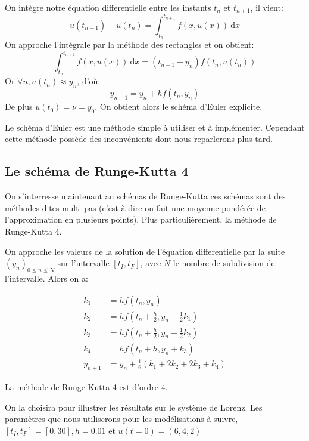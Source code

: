 \documentclass{article}
\newcommand{\cad}{c'est-\`a-dire }
\newtheorem[M , nocut]{prop}{Proposition}[section]
\newtheorem[M , nocut]{definition}{Définition}
\newtheorem[M , nocut]{lemme}{Lemme}
\newtheorem[L , nocut]{thm}{Théoreme}
\newtheorem[M , nocut]{cor}{Corollaire}
\begin{document}
\begin{example}
    On intègre notre équation differentielle entre les instants $t_{n}$ et $t_{n+1}$, il vient:
    \[
      u(t_{n+1}) - u(t_n) = \int_{t_n}^{t_{n+1}} f(x,u(x))\ \mathrm{d}x
    \]
    On approche l'intégrale par la méthode des rectangles et on obtient:
    \[
        \int_{t_n}^{t_{n+1}} f(x,u(x))\ \mathrm{d}x = (t_{n+1}-y_n)f(t_n,u(t_n))
    \]Or $\forall n , u(t_n) \approx y_n $, d'où:
    \[
        y_{n+1} = y_n + h f(t_n,y_n)
    \]De plus $u(t_0) = \nu = y_0$. On obtient alors le schéma d'Euler explicite.
\end{example}
Le schéma d'Euler est une méthode simple à utiliser et à implémenter. Cependant cette méthode possède des inconvénients dont nous reparlerons plus tard. 

\subsection*{Le schéma de Runge-Kutta 4}

On s'interresse maintenant au schémas de Runge-Kutta ces schémas sont des méthodes dites multi-pas (\cad on fait une moyenne pondérée de l'approximation en plusieurs points). Plus particulièrement, la méthode de Runge-Kutta 4.
\begin{definition}
    On approche les valeurs de la solution de l'équation differentielle par la suite $(y_n)_{0\le n \le N}$ sur l'intervalle $[t_I,t_F]$, avec $N$ le nombre de subdivision de l'intervalle. Alors on a: 

    \begin{align*}
    k_1 &= h f(t_n, y_n) \\
    k_2 &= h f\left(t_n + \frac{h}{2}, y_n + \frac{1}{2}k_1\right) \\
    k_3 &= h f\left(t_n + \frac{h}{2}, y_n + \frac{1}{2}k_2\right) \\
    k_4 &= h f(t_n + h, y_n + k_3)\\
    y_{n+1} &= y_n + \frac{1}{6}(k_1 + 2k_2 + 2k_3 + k_4) 
    \end{align*}
    
    La méthode de Runge-Kutta 4 est d'ordre 4.
\end{definition}
On la choisira pour illustrer les résultats sur le système de Lorenz. Les paramètres que nous utiliserons pour les modélisations à suivre, $[t_I,t_F] = [0,30], h = 0.01 \text{ et }u(t=0)= (6,4,2)$
\end{document}
